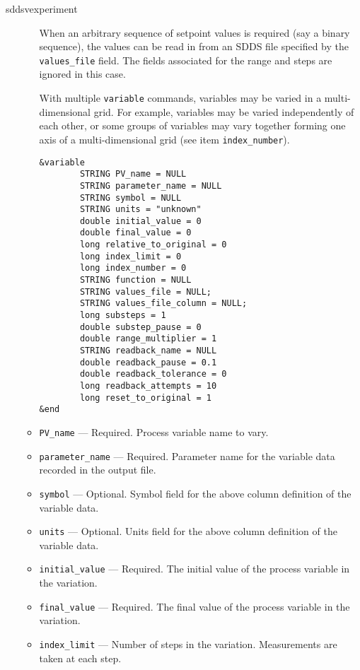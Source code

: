 \begin{sddsprog}{sddsvexperiment}
\begin{itemize}
\begin{itemize}
      When an arbitrary sequence of setpoint values is required (say a
      binary sequence), the values can be read in from an SDDS file
      specified by the {\verb+values_file+} field.  The fields
      associated for the range and steps are ignored in this case.

      With multiple \verb+variable+ commands, variables may be varied
      in a multi-dimensional grid.  For example, variables may be
      varied independently of each other, or some groups of variables
      may vary together forming one axis of a multi-dimensional grid
      (see item {\verb+index_number+}).

\begin{verbatim}
&variable
        STRING PV_name = NULL
        STRING parameter_name = NULL
        STRING symbol = NULL
        STRING units = "unknown"
        double initial_value = 0
        double final_value = 0
        long relative_to_original = 0
        long index_limit = 0
        long index_number = 0
        STRING function = NULL
        STRING values_file = NULL;
        STRING values_file_column = NULL;
        long substeps = 1
        double substep_pause = 0
        double range_multiplier = 1
        STRING readback_name = NULL
        double readback_pause = 0.1
        double readback_tolerance = 0
        long readback_attempts = 10
        long reset_to_original = 1
&end
\end{verbatim}
    \item {\verb+PV_name+} --- Required. Process variable name to vary.

    \item {\verb+parameter_name+} --- Required. Parameter name for the
   variable data recorded in the output file.

    \item {\verb+symbol+} --- Optional. Symbol field for the above
   column definition of the variable data.

    \item {\verb+units+} --- Optional. Units field for the above column
   definition of the variable data.

    \item {\verb+initial_value+} --- Required. The initial value of the
   process variable in the variation.

    \item {\verb+final_value+} --- Required. The final value of the
   process variable in the variation.

    \item {\verb+index_limit+} --- Number of steps in the
   variation. Measurements are taken at each step.


\end{itemize}
\end{itemize}
\end{sddsprog}
